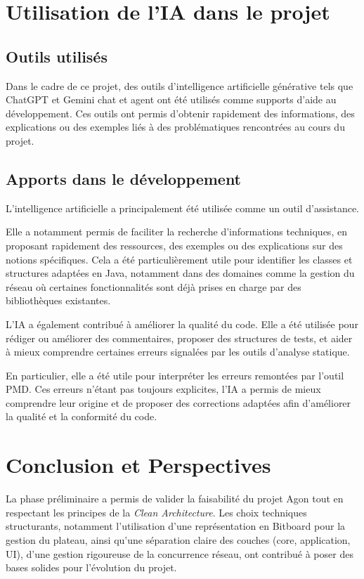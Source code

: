 \documentclass[a4paper]{article}
\begin{document}
\section{Utilisation de l'IA dans le projet}

\subsection{Outils utilisés}

Dans le cadre de ce projet, des outils d’intelligence artificielle générative tels que ChatGPT et Gemini chat et agent ont été utilisés comme supports d’aide au développement. Ces outils ont permis d’obtenir rapidement des informations, des explications ou des exemples liés à des problématiques rencontrées au cours du projet.

\subsection{Apports dans le développement}

L’intelligence artificielle a principalement été utilisée comme un outil d’assistance.

Elle a notamment permis de faciliter la recherche d’informations techniques, en proposant rapidement des ressources, des exemples ou des explications sur des notions spécifiques. Cela a été particulièrement utile pour identifier les classes et structures adaptées en Java, notamment dans des domaines comme la gestion du réseau où certaines fonctionnalités sont déjà prises en charge par des bibliothèques existantes.

L’IA a également contribué à améliorer la qualité du code. Elle a été utilisée pour rédiger ou améliorer des commentaires, proposer des structures de tests, et aider à mieux comprendre certaines erreurs signalées par les outils d’analyse statique.

En particulier, elle a été utile pour interpréter les erreurs remontées par l’outil PMD. Ces erreurs n’étant pas toujours explicites, l’IA a permis de mieux comprendre leur origine et de proposer des corrections adaptées afin d’améliorer la qualité et la conformité du code.

\section{Conclusion et Perspectives}

La phase préliminaire a permis de valider la faisabilité du projet Agon tout en respectant les principes de la \textit{Clean Architecture}. Les choix techniques structurants, notamment l’utilisation d’une représentation en Bitboard pour la gestion du plateau, ainsi qu’une séparation claire des couches (core, application, UI), d’une gestion rigoureuse de la concurrence réseau, ont contribué à poser des bases solides pour l’évolution du projet.
\end{document}

